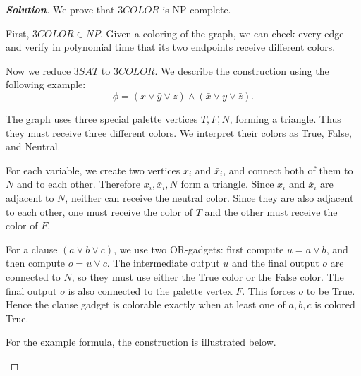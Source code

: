 \documentclass[a4paper, UTF-8]{article}
\theoremstyle{plain}
\newenvironment{solution}{\begin{proof}[\indent\bf Solution]}{\end{proof}}
\begin{document}
\begin{solution}
We prove that $3COLOR$ is NP-complete.

First, $3COLOR\in NP$. Given a coloring of the graph, we can check every edge
and verify in polynomial time that its two endpoints receive different colors.

Now we reduce $3SAT$ to $3COLOR$. We describe the construction using the
following example:
\[
  \phi=(x\vee \bar y\vee z)\wedge(\bar x\vee y\vee \bar z).
\]

The graph uses three special palette vertices $T,F,N$, forming a triangle.
Thus they must receive three different colors. We interpret their colors as
True, False, and Neutral.

For each variable, we create two vertices $x_i$ and $\bar x_i$, and connect
both of them to $N$ and to each other. Therefore $x_i,\bar x_i,N$ form a
triangle. Since $x_i$ and $\bar x_i$ are adjacent to $N$, neither can receive
the neutral color. Since they are also adjacent to each other, one must receive
the color of $T$ and the other must receive the color of $F$.

For a clause $(a\vee b\vee c)$, we use two OR-gadgets: first compute
$u=a\vee b$, and then compute $o=u\vee c$. The intermediate output $u$ and the
final output $o$ are connected to $N$, so they must use either the True color
or the False color. The final output $o$ is also connected to the palette
vertex $F$. This forces $o$ to be True. Hence the clause gadget is colorable
exactly when at least one of $a,b,c$ is colored True.

For the example formula, the construction is illustrated below.

\begin{center}
\end{center}
\end{solution}
\end{document}
